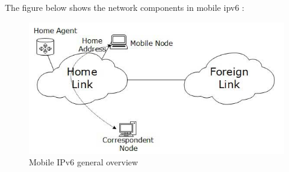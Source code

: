 \documentclass{article}
\begin{document}
The figure below shows the  network components in mobile ipv6 : 

\begin{figure}[h!]
  \centering
    \includegraphics[scale=0.5]{reportPictures/figure1.png}
  \caption{Mobile IPv6 general overview}
\end{figure}
\end{document}
